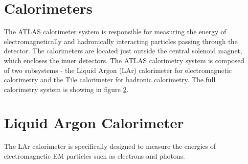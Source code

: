 \section{Calorimeters}
The ATLAS calorimeter system is responsible for measuring the energy of electromagnetically and hadronically interacting particles passing through the detector. The calorimeters are located just outside the central solenoid magnet, which encloses the inner detectors. The ATLAS calorimetry system is composed of two subsystems - the Liquid Argon (LAr) calorimeter for electromagnetic calorimetry and the Tile calorimeter for hadronic calorimetry. The full calorimetry system is showing in figure \ref{}.

\section{Liquid Argon Calorimeter}
The LAr calorimeter is specifically designed to measure the energies of electromagnetic EM particles such as electrons and photons. 
